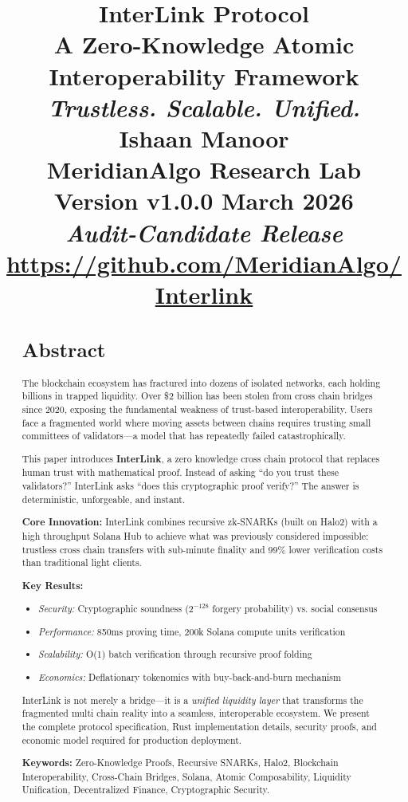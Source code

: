 \documentclass[11pt,a4paper]{article}
\title{
    \vspace{2in}
    \textbf{\Huge InterLink Protocol}\\
    \vspace{0.5in}
    \large A Zero-Knowledge Atomic Interoperability Framework\\
    \vspace{0.2in}
    \textit{Trustless. Scalable. Unified.}\\
    \vspace{1in}
    \textbf{Ishaan Manoor}\\
    MeridianAlgo Research Lab\\
    \vspace{0.1in}
    Version v1.0.0 \quad \textbullet \quad March 2026\\
    \vspace{0.1in}
    \textit{Audit-Candidate Release}\\
    \vspace{0.2in}
    {\small\url{https://github.com/MeridianAlgo/Interlink}}
}
\author{}
\date{}
\begin{document}
\begin{titlepage}
\maketitle
\end{titlepage}
\newpage

\tableofcontents
{}
{}
\clearpage
\begin{abstract}
 \section*{Abstract}

The blockchain ecosystem has fractured into dozens of isolated networks, each holding billions in trapped liquidity. Over \$2 billion has been stolen from cross chain bridges since 2020, exposing the fundamental weakness of trust-based interoperability. Users face a fragmented world where moving assets between chains requires trusting small committees of validators---a model that has repeatedly failed catastrophically.

This paper introduces \textbf{InterLink}, a zero knowledge cross chain protocol that replaces human trust with mathematical proof. Instead of asking ``do you trust these validators?'' InterLink asks ``does this cryptographic proof verify?'' The answer is deterministic, unforgeable, and instant.

\textbf{Core Innovation:} InterLink combines recursive zk-SNARKs (built on Halo2) with a high throughput Solana Hub to achieve what was previously considered impossible: trustless cross chain transfers with sub-minute finality and 99\% lower verification costs than traditional light clients.

\textbf{Key Results:}
\begin{itemize}[noitemsep,topsep=0pt]
    \item \textit{Security:} Cryptographic soundness ($2^{-128}$ forgery probability) vs. social consensus
    \item \textit{Performance:} 850ms proving time, 200k Solana compute units verification
    \item \textit{Scalability:} O(1) batch verification through recursive proof folding
    \item \textit{Economics:} Deflationary tokenomics with buy-back-and-burn mechanism
\end{itemize}

InterLink is not merely a bridge---it is a \textit{unified liquidity layer} that transforms the fragmented multi chain reality into a seamless, interoperable ecosystem. We present the complete protocol specification, Rust implementation details, security proofs, and economic model required for production deployment.

\vspace{0.3in}
\noindent\textbf{Keywords:} Zero-Knowledge Proofs, Recursive SNARKs, Halo2, Blockchain Interoperability, Cross-Chain Bridges, Solana, Atomic Composability, Liquidity Unification, Decentralized Finance, Cryptographic Security.
\end{abstract}
\end{document}
